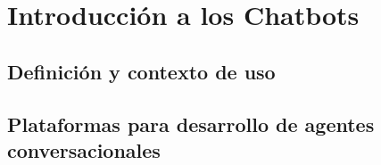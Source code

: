 \chapter{Introducción a los Chatbots}

\section{Definición y contexto de uso}

\section{Plataformas para desarrollo de agentes conversacionales}